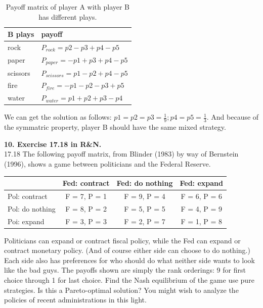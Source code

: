 \documentclass{article}
\begin{document}
{  \begin{table}[h]
    \centering
    \begin{tabular}{|l|l|}
      \hline
      \textbf{B plays} & \textbf{payoff} \\ \hline
      rock & $P_{rock}=p2-p3+p4-p5$ \\ \hline
      paper & $P_{paper}=-p1+p3+p4-p5$ \\ \hline
      scissors & $P_{scissors}=p1-p2+p4-p5$ \\ \hline
      fire & $P_{fire}=-p1-p2-p3+p5$ \\ \hline
      water & $P_{water}=p1+p2+p3-p4$\\ \hline
    \end{tabular}
    \caption{Payoff matrix of player A with player B has different plays.}
    \label{tbl:ai-hwk1-9b}
  \end{table} 

  We can get the solution as follows: $p1=p2=p3=\frac{1}{9}; p4=p5
  =\frac{1}{3}$. And because of the symmatric property, player B
  should have the same mixed strategy.}

\textbf{10. Exercise 17.18 in R\&N. } \\
17.18 The following payoff matrix, from Blinder (1983) by way of
Bernstein (1996), shows a game between politicians and the Federal
Reserve. 

\begin{table}[ht]
\centering
\begin{tabular}{|l|c|c|c|}
  \hline
  & Fed: contract & Fed: do nothing & Fed: expand \\ \hline
  Pol: contract & F = 7, P = 1 & F = 9, P = 4 & F = 6, P = 6 \\ \hline
  Pol: do nothing & F = 8, P = 2 & F = 5, P = 5 & F = 4, P = 9 \\ \hline
  Poi: expand & F = 3, P = 3 & F = 2, P = 7 & F = 1, P = 8 \\ \hline
\end{tabular}
\end{table}

Politicians can expand or contract fiscal policy, while the Fed can
expand or contract monetary policy. (And of course either side can
choose to do nothing.) Each side also has preferences for who should
do what neither side wants to look like the bad guys. The payoffs
shown are simply the rank orderings: 9 for first choice through 1 for
last choice. Find the Nash equilibrium of the game use pure
strategies. Is this a Pareto-optimal solution? You might wish to
analyze the policies of recent administrations in this light.
\end{document}
